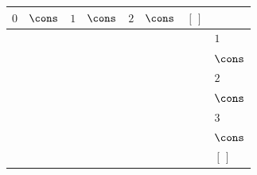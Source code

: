 {\scriptsize\setlength{\tabcolsep}{1.5pt}%
\begin{tabular}{ccccccc|l}
$\text{0}$ & $\cons$ & $\text{1}$ & $\cons$ & $\text{2}$ & $\cons$ & $[\,]$ & \\ \hline
\gcell{$\posD{\bullet}$} & \gcell{$\posC{\circ}$} & \gcell{$$} & \gcell{$$} & \gcell{$$} & \gcell{$$} & \gcell{$$} & $\text{1}$ \\
\gcell{$$} & \gcell{$\posC{\circ}$} & \gcell{$$} & \gcell{$$} & \gcell{$$} & \gcell{$$} & \gcell{$$} & $\cons$ \\
\gcell{$$} & \gcell{$\posC{\circ}$} & \gcell{$\posD{\bullet}$} & \gcell{$\posC{\circ}$} & \gcell{$$} & \gcell{$$} & \gcell{$$} & $\text{2}$ \\
\gcell{$$} & \gcell{$\posC{\circ}$} & \gcell{$$} & \gcell{$\posC{\circ}$} & \gcell{$$} & \gcell{$$} & \gcell{$$} & $\cons$ \\
\gcell{$$} & \gcell{$\posC{\circ}$} & \gcell{$$} & \gcell{$\posC{\circ}$} & \gcell{$\posD{\bullet}$} & \gcell{$\posC{\circ}$} & \gcell{$$} & $\text{3}$ \\
\gcell{$$} & \gcell{$\posC{\circ}$} & \gcell{$$} & \gcell{$\posC{\circ}$} & \gcell{$$} & \gcell{$\posC{\circ}$} & \gcell{$$} & $\cons$ \\
\gcell{$$} & \gcell{$\posC{\circ}$} & \gcell{$$} & \gcell{$\posC{\circ}$} & \gcell{$$} & \gcell{$\posC{\circ}$} & \gcell{$\posC{\circ}$} & $[\,]$ \\
\end{tabular}}
